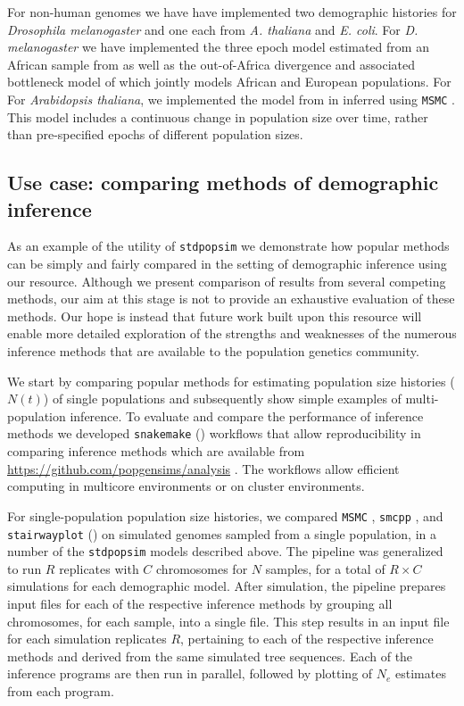 \documentclass[12pt,halfline,a4paper]{ouparticle}
\newcommand{\stdpopsim}{\texttt{stdpopsim} }
\newcommand{\MSMC}{\texttt{MSMC} }
\newcommand{\smcpp}{\texttt{smcpp} }
\newcommand{\stairwayplot}{\texttt{stairwayplot} }
\begin{document}
For non-human genomes we have have implemented two demographic histories for
\emph{Drosophila melanogaster} and one each from \emph{A. thaliana} and \emph{E. coli}.
For \emph{D. melanogaster} we have implemented the three epoch model estimated from
an African sample from \cite{sheehan2016deep} as well as the out-of-Africa divergence
and associated bottleneck model of \cite{li2006inferring} which jointly models African
and European populations. For For \emph{Arabidopsis thaliana}, we implemented the
model from in \cite{durvasula2017african} inferred using \MSMC. This model includes
a continuous change in population size over time, rather than pre-specified epochs of different
population sizes.


\subsection*{Use case: comparing methods of demographic inference}
As an example of the utility of \stdpopsim we demonstrate how popular
methods can be simply and fairly compared in the setting of demographic
inference using our resource. Although we present comparison of results from several
competing methods, our aim at this stage is not to provide an exhaustive
evaluation of these methods. Our hope is instead that future work built upon this resource
will enable more detailed exploration of the strengths and weaknesses of the numerous
inference methods that are available to the population genetics community.

We start by comparing popular methods for estimating
population size histories ($N(t)$) of single populations and subsequently
show simple examples of multi-population inference.
To evaluate and compare the performance of inference methods we developed
\texttt{snakemake} (\cite{koster2012snakemake}) workflows that allow reproducibility
in comparing inference methods which are available from \url{https://github.com/popgensims/analysis}
. The workflows allow efficient computing in multicore environments or on
cluster environments.

For single-population population size histories, we compared \MSMC, \smcpp, and
\stairwayplot (\cite{schiffels2014inferring,terhorst2017robust,liu2015exploring})
 on simulated genomes sampled from a single population,
in a number of the \stdpopsim models described above. The pipeline was generalized to
run $R$ replicates with $C$ chromosomes for $N$ samples, for a total of $R \times C$
simulations for each demographic model. After simulation, the pipeline prepares
input files for each of the respective inference methods by grouping all
chromosomes, for each sample, into a single file. This step results in an
input file for each simulation replicates $R$, pertaining to each of the
respective inference methods and derived from the same simulated tree sequences.
Each of the inference programs are then run in parallel, followed by plotting of
$N_e$ estimates from each program.
\end{document}
